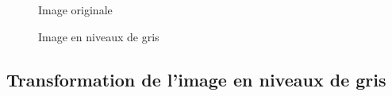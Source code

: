 \documentclass[french,a4paper,10pt]{article}
\begin{document}
    \begin{figure}[!htb]
        \begin{minipage}{0.48\textwidth}
            \centering
            \caption{Image originale}\label{Fig:orig-peppers}
        \end{minipage}\hfill
        \begin{minipage}{0.48\textwidth}
            \centering
            \caption{Image en niveaux de gris}\label{Fig:peppers-grey}
        \end{minipage}
    \end{figure}

    \subsection{Transformation de l'image en niveaux de gris}\label{subsec:1.2}
\end{document}
